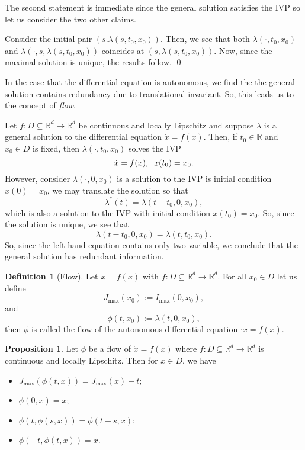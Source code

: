 \documentclass[
]{article}
\theoremstyle{definition}
\newtheorem{prop}{Proposition}
\theoremstyle{definition}
\newtheorem{definition}{Definition}[section]
\begin{document}
The second statement is immediate since the general solution satisfies
the IVP so let us consider the two other claims.

Consider the initial pair \((s. \lambda(s, t_0, x_0))\). Then, we see
that both \(\lambda(\cdot, t_0, x_0)\) and
\(\lambda(\cdot, s, \lambda(s, t_0, x_0))\) coincides at
\((s, \lambda(s, t_0, x_0))\). Now, since the maximal solution is
unique, the results follow. \qed

In the case that the differential equation is autonomous, we find the
the general solution contains redundancy due to translational invariant.
So, this leads us to the concept of \emph{flow}.

Let \(f : D \subseteq \mathbb{R}^d \to \mathbb{R}^d\) be continuous and
locally Lipschitz and suppose \(\lambda\) is a general solution to the
differential equation \(\dot x = f(x)\). Then, if \(t_0 \in \mathbb{R}\)
and \(x_0 \in D\) is fixed, then \(\lambda(\cdot, t_0, x_0)\) solves the
IVP \[\dot x = f(x), \hspace{2mm} x(t_0) = x_0.\] However, consider
\(\lambda(\cdot, 0, x_0)\) is a solution to the IVP is initial condition
\(x(0) = x_0\), we may translate the solution so that
\[\lambda^*(t) = \lambda(t - t_0, 0, x_0),\] which is also a solution to
the IVP with initial condition \(x(t_0) = x_0\). So, since the solution
is unique, we see that
\[\lambda(t - t_0, 0, x_0) = \lambda(t, t_0, x_0).\] So, since the left
hand equation contains only two variable, we conclude that the general
solution has redundant information.

\begin{definition}[Flow]
  Let \(\dot x = f(x)\) with \(f : D \subseteq \mathbb{R}^d \to \mathbb{R}^d\).
  For all \(x_0 \in D\) let us define 
  \[J_{\max}(x_0) := I_{\max}(0, x_0),\]
  and 
  \[\phi(t, x_0) := \lambda(t, 0, x_0),\]
  then \(\phi\) is called the flow of the autonomous differential equation 
  \(\cdot x = f(x)\).
\end{definition}

\begin{prop}
  Let \(\phi\) be a flow of \(\dot x = f(x)\) where \(f : D \subseteq 
  \mathbb{R}^d \to \mathbb{R}^d\) is continuous and locally Lipschitz. Then 
  for \(x \in D\), we have 
  \begin{itemize}
    \item \(J_{\max}(\phi(t, x)) = J_{\max}(x) - t\);
    \item \(\phi(0, x) = x\);
    \item \(\phi(t, \phi(s, x)) = \phi(t + s, x)\);
    \item \(\phi(-t, \phi(t, x)) = x\).
  \end{itemize}
\end{prop}
\proof
\end{document}
